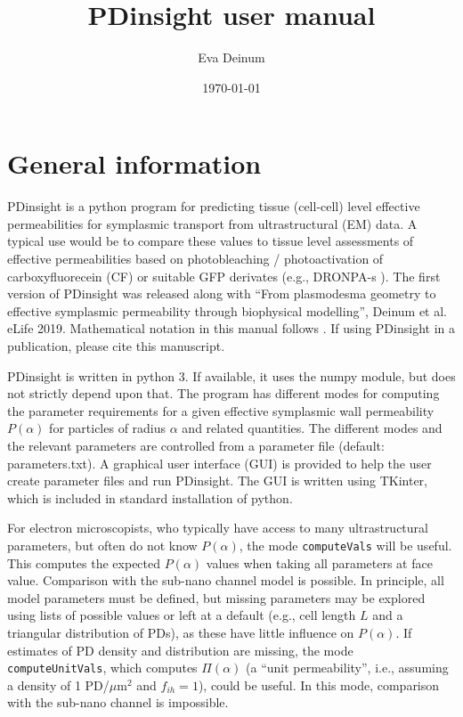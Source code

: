 \documentclass[a4paper,12pt]{article}
\author{Eva Deinum}
\title{PDinsight user manual}
\date{\today}
\newcommand{\patchy}{f_{ih}}
\begin{document}
\maketitle

\section{General information}
PDinsight is a python program for predicting tissue (cell-cell) level effective permeabilities for symplasmic transport from ultrastructural (EM) data. A typical use would be to compare these values to tissue level assessments of effective permeabilities based on photobleaching / photoactivation of carboxyfluorecein (CF) \citep{Rutschow.pp11} or suitable GFP derivates (e.g., DRONPA-s \citep{Gerlitz.pj18}). The first version of PDinsight was released along with ``From plasmodesma geometry to effective symplasmic permeability through biophysical modelling'', Deinum et al. eLife 2019. Mathematical notation in this manual follows \citep{Deinum.e19}. If using PDinsight in a publication, please cite this manuscript.

PDinsight is written in python 3. If available, it uses the numpy module, but does not strictly depend upon that. The program has different modes for computing the parameter requirements for a given effective symplasmic wall permeability $P(\alpha)$ for particles of radius $\alpha$ and related quantities. The different modes and the relevant parameters are controlled from a parameter file (default: parameters.txt). A graphical user interface (GUI) is provided to help the user create parameter files and run PDinsight. The GUI is written using TKinter, which is included in standard installation of python.

For electron microscopists, who typically  have access to many ultrastructural parameters, but often do not know $P(\alpha)$, the mode \texttt{computeVals} will be useful. This computes the expected $P(\alpha)$ values when taking all parameters at face value. Comparison with the sub-nano channel model is possible. In principle, all model parameters must be defined, but missing parameters may be explored using lists of possible values or left at a default (e.g., cell length $L$ and a triangular distribution of PDs), as these have little influence on $P(\alpha)$. If estimates of PD density and distribution are missing, the mode \texttt{computeUnitVals}, which computes $\Pi(\alpha)$ (a ``unit permeability'', i.e., assuming a density of 1 PD/$\mu$m$^2$ and $\patchy=1$), could be useful. In this mode, comparison with the sub-nano channel is impossible. 
\end{document}
